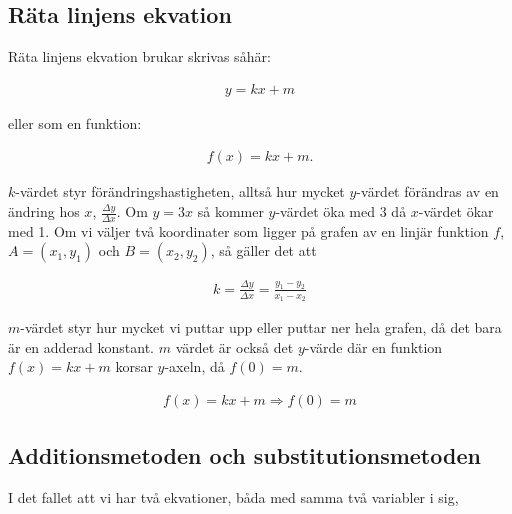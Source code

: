 \newpage
\subsection{Räta linjens ekvation}

Räta linjens ekvation brukar skrivas såhär:

\begin{align}
	y=kx+m
\end{align}

eller som en funktion:

\begin{align}
	f(x)=kx+m.
\end{align}

$k$-värdet styr förändringshastigheten, alltså hur mycket $y$-värdet förändras av en ändring hos $x$, $\frac{\Delta y}{\Delta x}$. Om $y = 3x$ så kommer $y$-värdet öka med $3$ då $x$-värdet ökar med 1. Om vi väljer två koordinater som ligger på grafen av en linjär funktion $f$, $A=(x_1,y_1)$ och $B=(x_2,y_2)$, så gäller det att

\begin{align}
	k = \frac{\Delta y}{\Delta x} = \frac{y_1-y_2}{x_1-x_2}
\end{align}

$m$-värdet styr hur mycket vi puttar upp eller puttar ner hela grafen, då det bara är en adderad konstant. $m$ värdet är också det $y$-värde där en funktion $f(x)=kx+m$ korsar $y$-axeln, då $f(0)=m$.

\begin{align}
	f(x) = kx+m \Rightarrow f(0) = m
\end{align}

\subsection{Additionsmetoden och substitutionsmetoden}

I det fallet att vi har två ekvationer, båda med samma två variabler i sig, 











































